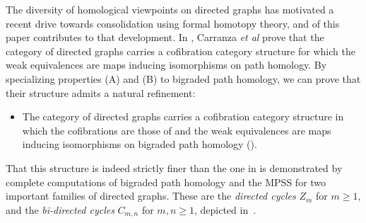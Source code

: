 \documentclass[a4paper, 11 pt, oneside, reqno]{amsart}
\numberwithin{lemma}{section}
\theoremstyle{definition}
\begin{document}
The diversity of homological viewpoints on directed graphs has motivated a recent drive towards consolidation using formal homotopy theory, and  of this paper contributes to that development. In \cite{CDKOSW}, Carranza \textit{et al} prove that the category of directed graphs carries a cofibration category structure for which the weak equivalences are maps inducing isomorphisms on path homology. By specializing properties (A) and (B) to bigraded path homology, we can prove that their structure admits a natural refinement:
\begin{itemize}
    \item[(C)]
    The category of directed graphs 
    carries a cofibration category structure 
    in which the cofibrations are those of \cite{CDKOSW} 
    and the weak equivalences are maps 
    inducing isomorphisms on bigraded path homology ().
\end{itemize}
That this structure is indeed strictly finer than the one in \cite{CDKOSW} is demonstrated by complete computations of bigraded path homology and the MPSS for two important families of directed graphs. These are the \emph{directed cycles} $Z_m$ for $m\geq 1$, and the \emph{bi-directed cycles} $C_{m,n}$ for $m,n\geq 1$, depicted in~.
\end{document}
